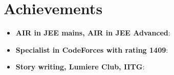 \documentclass[a4paper,10pt]{report}
\newcommand{\resumeItem}[2]{
  \item\small{
    \textbf{#1}{: #2 \vspace{-2pt}}
  }
}
\newcommand{\resumeSubItem}[2]{\resumeItem{#1}{#2}\vspace{-4pt}}
\newcommand{\resumeSubHeadingListStart}{\begin{itemize}[leftmargin=*]}
\newcommand{\resumeSubHeadingListEnd}{\end{itemize}}
\begin{document}
\vspace{4pt}


\section{Achievements}
\resumeSubHeadingListStart
  
\resumeSubItem{AIR  in JEE mains, AIR  in JEE Advanced}{}
\resumeSubItem{Specialist in CodeForces with rating 1409}{}
\resumeSubItem{Story writing, Lumiere Club, IITG}{}

\resumeSubHeadingListEnd
\end{document}

